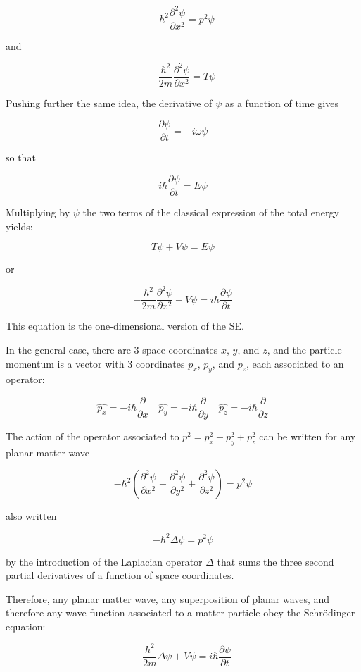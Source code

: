 \documentclass{article}
\begin{document}
\[
- \hbar^2 \frac{\partial^2 \psi}{\partial x^2} = p^2 \psi
\]

\noindent and

\[
- \frac{\hbar^2}{2m} \frac{\partial^2 \psi}{\partial x^2} = T \psi
\]

Pushing further the same idea, the derivative of $\psi$ as a function of time gives

\[ 
\frac{\partial \psi}{\partial t} = -i \omega \psi
\]

\noindent so that

\[
i \hbar \frac{\partial \psi}{\partial t} = E \psi
\]

Multiplying by $\psi$ the two terms of the classical expression of the total energy yields:

\[
T\psi + V\psi = E\psi
\]

\indent or

\[
- \frac{\hbar^2}{2m} \frac{\partial^2 \psi}{\partial x^2} + V\psi = i \hbar \frac{\partial \psi}{\partial t}
\]

This equation is the one-dimensional version of the SE.

In the general case, there are 3 space coordinates $x$, $y$, and $z$, and the particle momentum is a vector 
with 3 coordinates $p_x$, $p_y$, and $p_z$, each associated to an operator:

\[
\hat{p_x}=-i \hbar \frac{\partial}{\partial x} \quad \hat{p_y}=-i \hbar \frac{\partial}{\partial y} \quad \hat{p_z}=-i \hbar \frac{\partial}{\partial z}
\]

The action of the operator associated to $p^2 = p_x^2 + p_y^2 + p_z^2$ can be written for any planar matter wave

\[
- \hbar^2  \left( \frac{\partial^2 \psi}{\partial x^2} + \frac{\partial^2 \psi}{\partial y^2} + \frac{\partial^2 \psi}{\partial z^2} \right) =  p^2 \psi 
\]

\noindent also written

\[
- \hbar^2 \Delta \psi = p^2 \psi
\]

\noindent by the introduction of the Laplacian operator $\Delta$ that sums the three second partial derivatives of a function of space coordinates.

Therefore, any planar matter wave, any superposition of planar waves, 
and therefore any wave function associated to a matter particle obey the Schr\"{o}dinger equation:

\[
\boxed{
- \frac{\hbar^2}{2m} \Delta \psi + V\psi = i \hbar \frac{\partial \psi}{\partial t}
}
\]
\end{document}
